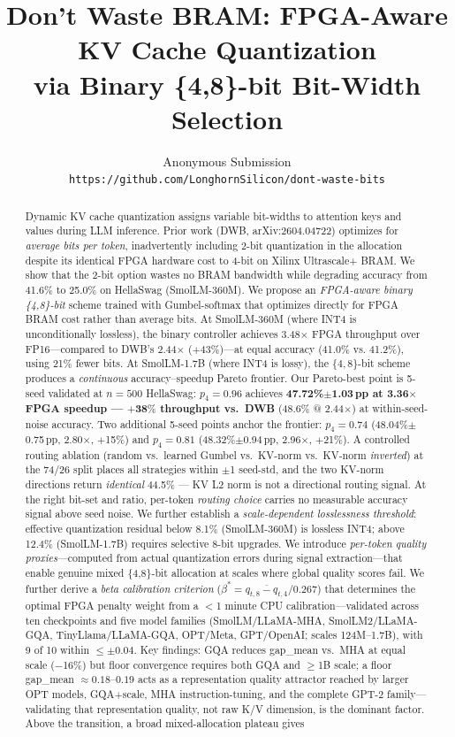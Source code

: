 \documentclass{article}
\title{\textbf{Don't Waste BRAM: FPGA-Aware KV Cache Quantization\\via Binary \{4,8\}-bit Bit-Width Selection}}
\author{
  Anonymous Submission\\
  \texttt{https://github.com/LonghornSilicon/dont-waste-bits}
}
\date{}
\begin{document}
\maketitle

\begin{abstract}
Dynamic KV cache quantization assigns variable bit-widths to attention keys and values during LLM inference. Prior work (DWB, arXiv:2604.04722) optimizes for \emph{average bits per token}, inadvertently including 2-bit quantization in the allocation despite its identical FPGA hardware cost to 4-bit on Xilinx Ultrascale+ BRAM. We show that the 2-bit option wastes no BRAM bandwidth while degrading accuracy from 41.6\% to 25.0\% on HellaSwag (SmolLM-360M). We propose an \emph{FPGA-aware binary \{4,8\}-bit} scheme trained with Gumbel-softmax that optimizes directly for FPGA BRAM cost rather than average bits. At SmolLM-360M (where INT4 is unconditionally lossless), the binary controller achieves 3.48$\times$ FPGA throughput over FP16---compared to DWB's 2.44$\times$ ($+$43\%)---at equal accuracy (41.0\% vs. 41.2\%), using 21\% fewer bits. At SmolLM-1.7B (where INT4 is lossy), the $\{4,8\}$-bit scheme produces a \emph{continuous} accuracy--speedup Pareto frontier. Our Pareto-best point is 5-seed validated at $n{=}500$ HellaSwag: $p_4{=}0.96$ achieves \textbf{47.72\%$\pm$1.03\,pp at 3.36$\times$ FPGA speedup --- $\mathbf{+38\%}$ throughput vs.\ DWB} (48.6\% @ 2.44$\times$) at within-seed-noise accuracy. Two additional 5-seed points anchor the frontier: $p_4{=}0.74$ (48.04\%$\pm$0.75\,pp, 2.80$\times$, $+$15\%) and $p_4{=}0.81$ (48.32\%$\pm$0.94\,pp, 2.96$\times$, $+$21\%). A controlled routing ablation (random vs.\ learned Gumbel vs.\ KV-norm vs.\ KV-norm \emph{inverted}) at the 74/26 split places all strategies within $\pm$1 seed-std, and the two KV-norm directions return \emph{identical} 44.5\% --- KV L2 norm is not a directional routing signal. At the right bit-set and ratio, per-token \emph{routing choice} carries no measurable accuracy signal above seed noise. We further establish a \emph{scale-dependent losslessness threshold}: effective quantization residual below 8.1\% (SmolLM-360M) is lossless INT4; above 12.4\% (SmolLM-1.7B) requires selective 8-bit upgrades. We introduce \emph{per-token quality proxies}---computed from actual quantization errors during signal extraction---that enable genuine mixed \{4,8\}-bit allocation at scales where global quality scores fail. We further derive a \emph{beta calibration criterion} ($\beta^* = \overline{q_{t,8} - q_{t,4}}/0.267$) that determines the optimal FPGA penalty weight from a $<$1 minute CPU calibration---validated across ten checkpoints and five model families (SmolLM/LLaMA-MHA, SmolLM2/LLaMA-GQA, TinyLlama/LLaMA-GQA, OPT/Meta, GPT/OpenAI; scales 124M--1.7B), with 9 of 10 within $\leq\pm0.04$. Key findings: GQA reduces gap\_mean vs.\ MHA at equal scale ($-$16\%) but floor convergence requires both GQA and $\geq$1B scale; a floor gap\_mean $\approx 0.18$--$0.19$ acts as a representation quality attractor reached by larger OPT models, GQA+scale, MHA instruction-tuning, and the complete GPT-2 family---validating that representation quality, not raw K/V dimension, is the dominant factor. Above the transition, a broad mixed-allocation plateau gives 
\end{abstract}
\end{document}
